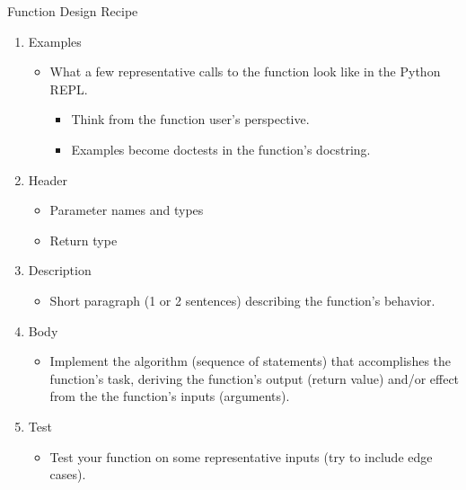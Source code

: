 \documentclass[smaller, aspectratio=1610]{beamer}
\begin{document}
\begin{frame}[label={sec:org7050158}]{Function Design Recipe}
\begin{enumerate}
\item Examples
\begin{itemize}
\item What a few representative calls to the function look like in the Python REPL.
\begin{itemize}
\item Think from the function \alert{user's} perspective.
\item Examples become doctests in the function's docstring.
\end{itemize}
\end{itemize}

\item Header
\begin{itemize}
\item Parameter names and types
\item Return type
\end{itemize}

\item Description
\begin{itemize}
\item Short paragraph (1 or 2 sentences) describing the function's behavior.
\end{itemize}

\item Body
\begin{itemize}
\item Implement the algorithm (sequence of statements) that accomplishes the function's task, deriving the function's output (return value) and/or effect from the the function's inputs (arguments).
\end{itemize}

\item Test
\begin{itemize}
\item Test your function on some representative inputs (try to include edge cases).
\end{itemize}
\end{enumerate}
\end{frame}
\end{document}
